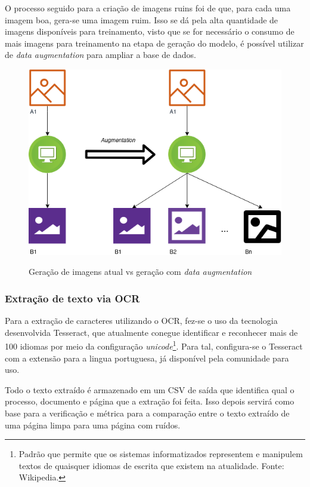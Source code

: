 O processo seguido para a criação de imagens ruins foi de que, para cada uma imagem boa, gera-se uma imagem ruim. Isso se dá pela alta quantidade de imagens disponíveis para treinamento, visto que se for necessário o consumo de mais imagens para treinamento na etapa de geração do modelo, é possível utilizar de \textit{data augmentation} para ampliar a base de dados.

\begin{figure}[H]
  \centering
  \caption{Geração de imagens atual vs geração com \textit{data augmentation}}
  \includegraphics[scale=.6]{figuras/data-augmentation.png}
  \label{fig:data-augmentation}
\end{figure}

\subsubsection{Extração de texto via OCR}

Para a extração de caracteres utilizando o OCR, fez-se o uso da tecnologia desenvolvida Tesseract, que atualmente conegue identificar e reconhecer mais de 100 idiomas por meio da configuração \textit{unicode}\footnote{
  Padrão que permite que os sistemas informatizados representem e manipulem textos de quaisquer idiomas de escrita que existem na atualidade. Fonte: Wikipedia.
}. Para tal, configura-se o Tesseract com a extensão para a lingua portuguesa, já disponível pela comunidade para uso.

Todo o texto extraído é armazenado em um CSV de saída que identifica qual o processo, documento e página que a extração foi feita. Isso depois servirá como base para a verificação e métrica para a comparação entre o texto extraído de uma página limpa para uma página com ruídos.

